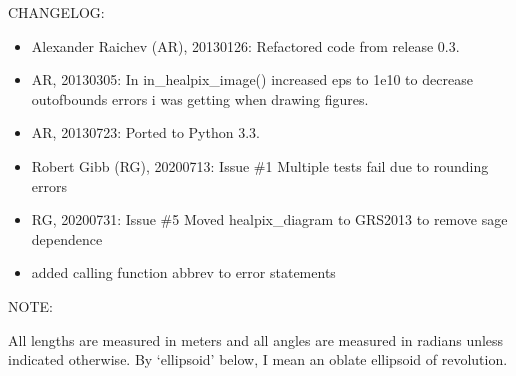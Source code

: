 \documentclass[a4paper,12ptopenany,oneside,english]{sphinxmanual}
\begin{document}
\sphinxAtStartPar
CHANGELOG:
\begin{itemize}
\item {} 
\sphinxAtStartPar
Alexander Raichev (AR), 2013\sphinxhyphen{}01\sphinxhyphen{}26: Refactored code from release 0.3.

\item {} 
\sphinxAtStartPar
AR, 2013\sphinxhyphen{}03\sphinxhyphen{}05: In in\_healpix\_image() increased eps to 1e\sphinxhyphen{}10 to decrease out\sphinxhyphen{}of\sphinxhyphen{}bounds errors i was getting when drawing figures.

\item {} 
\sphinxAtStartPar
AR, 2013\sphinxhyphen{}07\sphinxhyphen{}23: Ported to Python 3.3.

\item {} 
\sphinxAtStartPar
Robert Gibb (RG), 2020\sphinxhyphen{}07\sphinxhyphen{}13: Issue \#1 Multiple tests fail due to rounding errors

\item {} 
\sphinxAtStartPar
RG, 2020\sphinxhyphen{}07\sphinxhyphen{}31: Issue \#5 Moved healpix\_diagram to GRS2013 to remove sage dependence

\item {} \begin{description}
\sphinxAtStartPar
added calling function abbrev to error statements

\end{description}

\end{itemize}

\sphinxAtStartPar
NOTE:

\sphinxAtStartPar
All lengths are measured in meters and all angles are measured in radians
unless indicated otherwise.
By ‘ellipsoid’ below, I mean an oblate ellipsoid of revolution.
\end{document}
